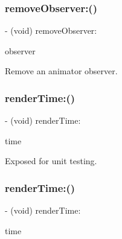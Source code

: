 \subsubsection{\texorpdfstring{remove\+Observer\+:()}{removeObserver:()}\hspace{0.1cm}{\footnotesize\ttfamily [2/2]}}
{\footnotesize\ttfamily -\/ (void) remove\+Observer\+: \begin{DoxyParamCaption}\item[{(id$<$ P\+O\+P\+Animator\+Observing $>$)}]{observer }\end{DoxyParamCaption}\hspace{0.3cm}{\ttfamily [implementation]}}

Remove an animator observer. \mbox{\label{interface_p_o_p_animator_a6824004e158ffe4729b2a45da5f087cb}} 
\subsubsection{\texorpdfstring{render\+Time\+:()}{renderTime:()}\hspace{0.1cm}{\footnotesize\ttfamily [1/2]}}
{\footnotesize\ttfamily -\/ (void) render\+Time\+: \begin{DoxyParamCaption}\item[{(C\+F\+Time\+Interval)}]{time }\end{DoxyParamCaption}\hspace{0.3cm}{\ttfamily [implementation]}}

Exposed for unit testing. \mbox{\label{interface_p_o_p_animator_a6824004e158ffe4729b2a45da5f087cb}} 
\subsubsection{\texorpdfstring{render\+Time\+:()}{renderTime:()}\hspace{0.1cm}{\footnotesize\ttfamily [2/2]}}
{\footnotesize\ttfamily -\/ (void) render\+Time\+: \begin{DoxyParamCaption}\item[{(C\+F\+Time\+Interval)}]{time }\end{DoxyParamCaption}\hspace{0.3cm}{\ttfamily [implementation]}}

